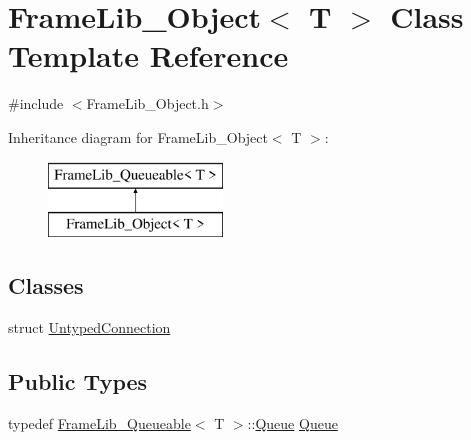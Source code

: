 \hypertarget{class_frame_lib___object}{}\section{Frame\+Lib\+\_\+\+Object$<$ T $>$ Class Template Reference}
\label{class_frame_lib___object}


{\ttfamily \#include $<$Frame\+Lib\+\_\+\+Object.\+h$>$}

Inheritance diagram for Frame\+Lib\+\_\+\+Object$<$ T $>$\+:\begin{figure}[H]
\begin{center}
\leavevmode
\includegraphics[height=2.000000cm]{class_frame_lib___object}
\end{center}
\end{figure}
\subsection*{Classes}
\begin{DoxyCompactItemize}
\item 
struct \hyperlink{struct_frame_lib___object_1_1_untyped_connection}{Untyped\+Connection}
\end{DoxyCompactItemize}
\subsection*{Public Types}
\begin{DoxyCompactItemize}
\item 
typedef \hyperlink{class_frame_lib___queueable}{Frame\+Lib\+\_\+\+Queueable}$<$ T $>$\+::\hyperlink{class_frame_lib___object_a481c704666e7bd901f64b2b255f79784}{Queue} \hyperlink{class_frame_lib___object_a481c704666e7bd901f64b2b255f79784}{Queue}
\end{DoxyCompactItemize}
